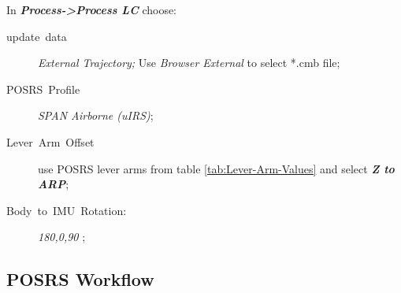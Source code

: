 \documentclass[11pt,fleqn]{book} %
\begin{document}
In \textbf{\emph{Process->Process LC}} choose:
\begin{description}
	\item [{update~data}] \emph{External Trajectory; }Use \emph{Browser External} to select {*}.cmb file;
	\item [{POSRS~Profile}] \emph{SPAN Airborne (uIRS)};
	\item [{Lever~Arm~Offset}] use POSRS lever arms from table \ref{tab:Lever-Arm-Values} and select \textbf{\emph{Z to ARP}};
	\item [{Body~to~IMU~Rotation:}] \emph{180,0,90 };
\end{description}
	
\subsection{POSRS Workflow\label{sub:POSRS-Workflow}}
\end{document}
